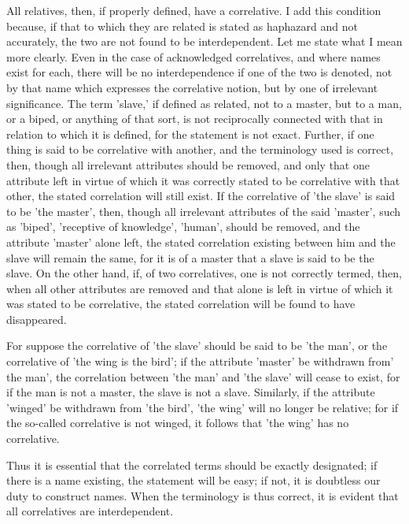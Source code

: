 All relatives, then, if properly defined, have a correlative. I add
this condition because, if that to which they are related is stated as
haphazard and not accurately, the two are not found to be
interdependent. Let me state what I mean more clearly. Even in the case
of acknowledged correlatives, and where names exist for each, there
will be no interdependence if one of the two is denoted, not by that
name which expresses the correlative notion, but by one of irrelevant
significance. The term 'slave,' if defined as related, not to a master,
but to a man, or a biped, or anything of that sort, is not reciprocally
connected with that in relation to which it is defined, for the
statement is not exact. Further, if one thing is said to be correlative
with another, and the terminology used is correct, then, though all
irrelevant attributes should be removed, and only that one attribute
left in virtue of which it was correctly stated to be correlative with
that other, the stated correlation will still exist. If the correlative
of 'the slave' is said to be 'the master', then, though all irrelevant
attributes of the said 'master', such as 'biped', 'receptive of
knowledge', 'human', should be removed, and the attribute 'master'
alone left, the stated correlation existing between him and the slave
will remain the same, for it is of a master that a slave is said to be
the slave. On the other hand, if, of two correlatives, one is not
correctly termed, then, when all other attributes are removed and that
alone is left in virtue of which it was stated to be correlative, the
stated correlation will be found to have disappeared.

For suppose the correlative of 'the slave' should be said to be 'the
man', or the correlative of 'the wing is the bird'; if the attribute
'master' be withdrawn from' the man', the correlation between 'the man'
and 'the slave' will cease to exist, for if the man is not a master,
the slave is not a slave. Similarly, if the attribute 'winged' be
withdrawn from 'the bird', 'the wing' will no longer be relative; for
if the so-called correlative is not winged, it follows that 'the wing'
has no correlative.

Thus it is essential that the correlated terms should be exactly
designated; if there is a name existing, the statement will be easy; if
not, it is doubtless our duty to construct names. When the terminology
is thus correct, it is evident that all correlatives are interdependent.

